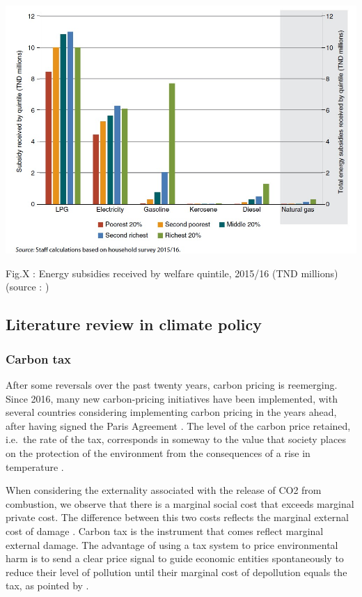 \documentclass[
]{article}
\begin{document}
\includegraphics{Images/Energy subsdies received by welfare quintile.jpg}

Fig.X : Energy subsidies received by welfare quintile, 2015/16 (TND
millions) (source : \textcite{tunisia2020})

\hypertarget{literature-review-in-climate-policy}{%
\subsection{Literature review in climate
policy}\label{literature-review-in-climate-policy}}

\hypertarget{carbon-tax}{%
\subsubsection{Carbon tax}\label{carbon-tax}}

After some reversals over the past twenty years, carbon pricing is
reemerging. Since 2016, many new carbon-pricing initiatives have been
implemented, with several countries considering implementing carbon
pricing in the years ahead, after having signed the Paris Agreement
\autocite{klenert2018}. The level of the carbon price retained, i.e.~the
rate of the tax, corresponds in someway to the value that society places
on the protection of the environment from the consequences of a rise in
temperature \autocite{deperthuis2010}.

When considering the externality associated with the release of CO2 from
combustion, we observe that there is a marginal social cost that exceeds
marginal private cost. The difference between this two costs reflects
the marginal external cost of damage \autocite{goulder2013}. Carbon tax
is the instrument that comes reflect marginal external damage. The
advantage of using a tax system to price environmental harm is to send a
clear price signal to guide economic entities spontaneously to reduce
their level of pollution until their marginal cost of depollution equals
the tax, as pointed by \textcite{deperthuis2010} .
\end{document}
